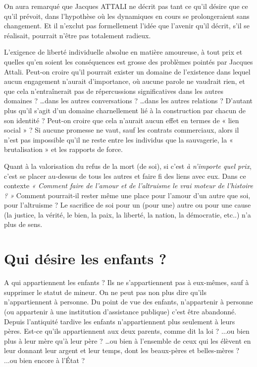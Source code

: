 On aura remarqué que Jacques ATTALI ne décrit pas tant ce qu'il désire que ce qu'il prévoit, dans l'hypothèse où les dynamiques en cours se prolongeraient sans changement. Et il n'exclut pas formellement l'idée que l'avenir qu'il décrit, s'il se réalisait, pourrait n'être pas totalement radieux. 



 L'exigence de liberté individuelle absolue en matière amoureuse, à tout prix et quelles qu'en soient les conséquences est grosse des problèmes pointés par Jacques Attali. Peut-on croire qu'il pourrait exister un domaine de l'existence dans lequel aucun engagement n'aurait d'importance, où aucune parole ne vaudrait rien, et que cela n'entraînerait pas de répercussions significatives dans les autres domaines ? …dans les autres conversations ? …dans les autres relations ? D’autant plus qu'il s'agit d'un domaine charnellement lié à la construction par chacun de son identité ? Peut-on croire que cela n'aurait aucun effet en termes de « lien social » ? Si  aucune promesse ne vaut, sauf les contrats commerciaux, alors il n’est pas impossible qu’il ne reste entre les individus que la sauvagerie, la « brutalisation » et les rapports de force. 
 
 Quant à la valorisation du refus de la mort (de soi), si c'est \emph{à n'importe quel prix}, c'est se placer au-dessus de tous les autres et faire fi des liens avec eux. Dans ce contexte \emph{« Comment faire de l'amour et de l'altruisme le vrai moteur de l'histoire ? »} Comment pourrait-il rester même une place pour l'amour d'un autre que soi, pour l'altruisme ? Le sacrifice de soi pour un (pour une) autre ou pour une cause (la justice, la vérité, le bien, la paix, la liberté, la nation, la démocratie, etc..) n'a plus de sens. 



\section{Qui désire les enfants ?} 

 
 A qui appartiennent les enfants ?  Ils ne s'appartiennent pas à eux-mêmes, sauf à supprimer le statut de mineur. On ne peut pas non plus dire qu'ils n'appartiennent à personne. Du point de vue des enfants, n'appartenir à personne (ou appartenir à une institution d'assistance publique) c'est être abandonné. 
 Depuis l’antiquité tardive les enfants n'appartiennent plus seulement à leurs pères. Est-ce qu'ils appartiennent aux deux parents, comme dit la loi ? ...ou bien plus à leur mère qu’à leur père ? …ou bien à l'ensemble de ceux qui les élèvent en leur donnant leur argent et leur temps, dont les beaux-pères et belles-mères ? ...ou bien encore à l'État ? 
 
